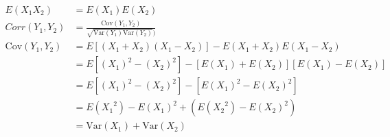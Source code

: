 \documentclass{article}
\newcommand{\var}{\text{Var}}
\newcommand{\cov}{\text{Cov}}
\begin{document}
\begin{align*}
	E(X_1X_2) &= E(X_1) E(X_2)\\
	Corr(Y_1, Y_2) &= \frac{\cov(Y_1, Y_2)}{\sqrt{\var(Y_1)\var(Y_2)})}\\
	\cov(Y_1, Y_2) &= E[(X_1 + X_2)(X_1 - X_2)] - E(X_1 + X_2)E(X_1 - X_2)\\
	&= E[(X_1)^2 - (X_2)^2] - \left[ E(X_1) + E(X_2) \right]\left[ E(X_1) - E(X_2) \right]\\
	&= E[(X_1)^2 - (X_2)^2] - \left[ E(X_1)^2 - E(X_2)^2 \right]\\
	&= E({X_1}^2) - E(X_1)^2 + (E({X_2}^2) - E(X_2)^2)\\
	&= \var(X_1) + \var(X_2)
\end{align*}
	
\end{document}
